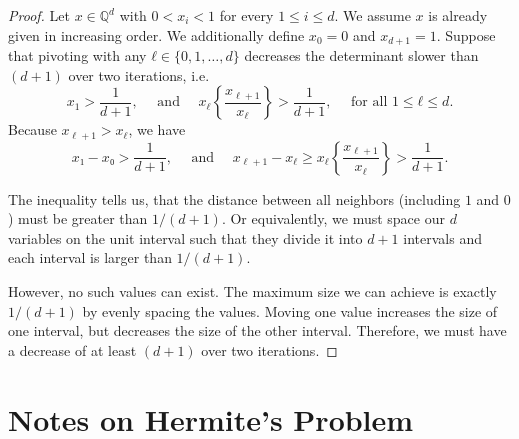 \documentclass[english,version-2020-11]{uzl-thesis}
\begin{document}
\begin{proof}
  Let $x ∈ ℚ^d$ with $0 < x_i < 1$ for every $1 ≤ i ≤ d$.
  We assume $x$ is already given in increasing order.
  We additionally define $x_0 = 0$ and $x_{d+1} = 1$.
  Suppose that pivoting with any $ℓ ∈ \{0, 1, \dots, d\}$
  decreases the determinant slower than $(d+1)$ over two iterations,
  i.e.
  \[
    x_1 > \frac{1}{d+1},
    \quad \text{ and } \quad
    x_\ell \left\{\frac{x_{\ell+1}}{x_\ell}\right\} > \frac{1}{d+1}, \quad \text{ for all } 1 ≤ ℓ ≤ d.
  \]
  Because $x_{\ell+1} > x_\ell$, we have
  \[
    x₁ - x₀ > \frac{1}{d+1},
    \quad \text{ and } \quad
    x_{\ell+1} - x_\ell ≥ x_\ell \left\{\frac{x_{\ell+1}}{x_\ell}\right\} > \frac{1}{d+1}.
  \]

  The inequality tells us, that the distance between all neighbors
  (including $1$ and $0$) must be greater than $1/(d+1)$.
  Or equivalently, we must space our $d$ variables on the unit interval such that they
  divide it into $d+1$ intervals and each interval is larger than $1/(d+1)$.

  {\begin{center}
  \end{center}}

  However, no such values can exist.
  The maximum size we can achieve is exactly $1/(d+1)$ by evenly
  spacing the values.
  Moving one value increases the size of one interval, but decreases the size
  of the other interval.
  Therefore, we must have a decrease of at least $(d+1)$ over two iterations.
\end{proof}

\chapter{Notes on Hermite's Problem}
\end{document}
